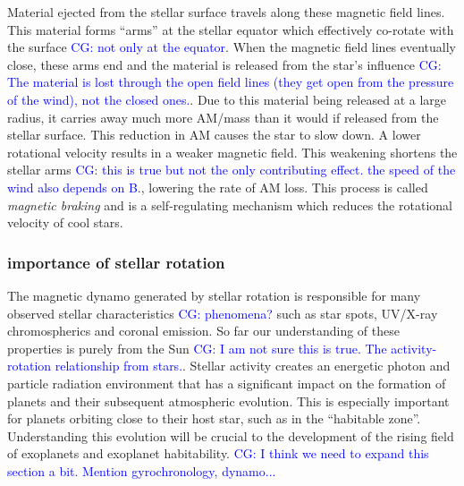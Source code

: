 \documentclass[fleqn,usenatbib]{mnras}
\begin{document}
Material ejected from the stellar surface travels along these magnetic field lines.
This material forms “arms” at the stellar equator which effectively co-rotate with the surface  \textcolor{blue}{CG: not only at the equator}.
When the magnetic field lines eventually close, these arms end and the material is released from the star’s influence \textcolor{blue}{CG: The material is lost through the open field lines (they get open from the pressure of the wind), not the closed ones.}.
Due to this material being released at a large radius, it carries away much more AM/mass than it would if released from the stellar surface.
This reduction in AM causes the star to slow down. 
A lower rotational velocity results in a weaker magnetic field.
This weakening shortens the stellar arms \textcolor{blue}{CG: this is true but not the only contributing effect. the speed of the wind also depends on B.}, lowering the rate of AM loss.
This process is called \textit{magnetic braking} and is a self-regulating mechanism which reduces the rotational velocity of cool stars. 

\subsubsection{importance of stellar rotation}
The magnetic dynamo generated by stellar rotation is responsible for many observed stellar characteristics \textcolor{blue}{CG: phenomena?} such as star spots, UV/X-ray chromospherics and coronal emission. 
So far our understanding of these properties is purely from the Sun \textcolor{blue}{CG: I am not sure this is true. The activity-rotation relationship from stars.}. 
Stellar activity creates an energetic photon and particle radiation environment that has a significant impact on the formation of planets and their subsequent atmospheric evolution. 
This is especially important for planets orbiting close to their host star, such as in the “habitable zone”.
Understanding this evolution will be crucial to the development of the rising field of exoplanets and exoplanet habitability. \textcolor{blue}{CG: I think we need to expand this section a bit. Mention gyrochronology, dynamo... }
\end{document}
